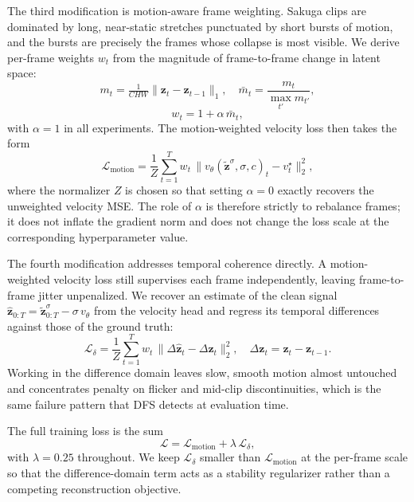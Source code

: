 \documentclass[10pt,twocolumn]{article}
\begin{document}
The third modification is motion-aware frame weighting. Sakuga clips are dominated by long, near-static stretches punctuated by short bursts of motion, and the bursts are precisely the frames whose collapse is most visible. We derive per-frame weights $w_t$ from the magnitude of frame-to-frame change in latent space:
\begin{equation}
m_t = \tfrac{1}{CHW}\bigl\|\mathbf{z}_{t} - \mathbf{z}_{t-1}\bigr\|_{1},
\quad
\bar m_t = \frac{m_t}{\max_{t'} m_{t'}},
\end{equation}
\begin{equation}
w_t = 1 + \alpha\,\bar m_t,
\label{eq:motion-weight}
\end{equation}
with $\alpha=1$ in all experiments. The motion-weighted velocity loss then takes the form
\begin{equation}
\mathcal{L}_{\text{motion}} = \frac{1}{Z}\sum_{t=1}^{T} w_t \,\bigl\| v_\theta(\widetilde{\mathbf{z}}^{\sigma},\sigma,c)_t - v^\star_t \bigr\|_2^2,
\label{eq:l-motion}
\end{equation}
where the normalizer $Z$ is chosen so that setting $\alpha=0$ exactly recovers the unweighted velocity MSE. The role of $\alpha$ is therefore strictly to rebalance frames; it does not inflate the gradient norm and does not change the loss scale at the corresponding hyperparameter value.

The fourth modification addresses temporal coherence directly. A motion-weighted velocity loss still supervises each frame independently, leaving frame-to-frame jitter unpenalized. We recover an estimate of the clean signal $\widehat{\mathbf{z}}_{0:T} = \widetilde{\mathbf{z}}^{\sigma}_{0:T} - \sigma\,v_\theta$ from the velocity head and regress its temporal differences against those of the ground truth:
\begin{equation}
\mathcal{L}_{\delta} = \frac{1}{Z}\sum_{t=1}^{T} w_t \,\bigl\| \Delta\widehat{\mathbf{z}}_t - \Delta\mathbf{z}_t \bigr\|_2^2,
\quad \Delta\mathbf{z}_t = \mathbf{z}_t - \mathbf{z}_{t-1}.
\label{eq:l-delta}
\end{equation}
Working in the difference domain leaves slow, smooth motion almost untouched and concentrates penalty on flicker and mid-clip discontinuities, which is the same failure pattern that DFS detects at evaluation time.

The full training loss is the sum
\begin{equation}
\mathcal{L} = \mathcal{L}_{\text{motion}} + \lambda\,\mathcal{L}_{\delta},
\label{eq:final-obj}
\end{equation}
with $\lambda = 0.25$ throughout. We keep $\mathcal{L}_{\delta}$ smaller than $\mathcal{L}_{\text{motion}}$ at the per-frame scale so that the difference-domain term acts as a stability regularizer rather than a competing reconstruction objective.
\end{document}
